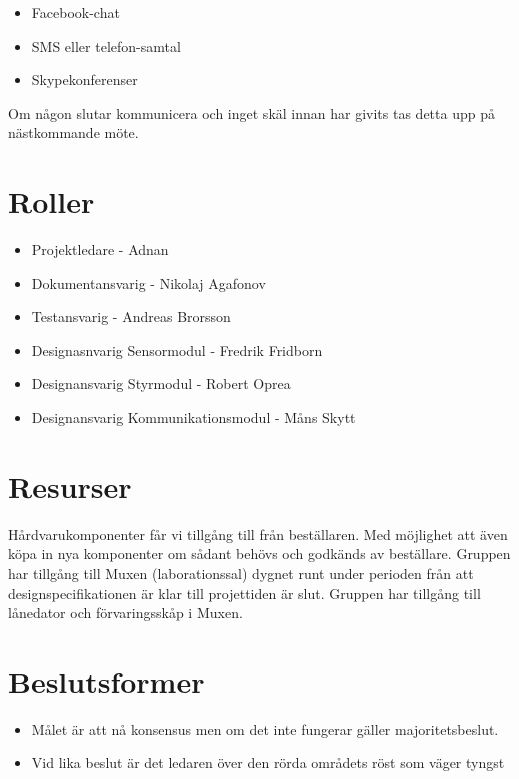 \documentclass[11pt]{article}
\begin{document}
\begin{flushleft}
\begin{itemize}
\item Facebook-chat

\item SMS eller telefon-samtal

\item Skypekonferenser

\end{itemize}

Om någon slutar kommunicera och inget skäl innan har givits tas detta upp på nästkommande möte. 

\pagebreak
\section{Roller}

\begin{itemize}
\item Projektledare - Adnan
\item Dokumentansvarig - Nikolaj Agafonov
\item Testansvarig - Andreas Brorsson
\item Designasnvarig Sensormodul - Fredrik Fridborn
\item Designansvarig Styrmodul - Robert Oprea
\item Designansvarig Kommunikationsmodul - Måns Skytt

\end{itemize}

\section{Resurser}
Hårdvarukomponenter får vi tillgång till från beställaren. Med möjlighet att även köpa in nya komponenter om sådant behövs och godkänds av beställare. Gruppen har tillgång till Muxen (laborationssal) dygnet runt under perioden från att designspecifikationen är klar till projettiden är slut.
Gruppen har tillgång till lånedator och förvaringsskåp i Muxen.


\section{Beslutsformer}

\begin{itemize}
\item Målet är att nå konsensus men om det inte fungerar gäller majoritetsbeslut.

\item Vid lika beslut är det ledaren över den rörda områdets röst som väger tyngst



\end{itemize}
\end{flushleft}
\end{document}
